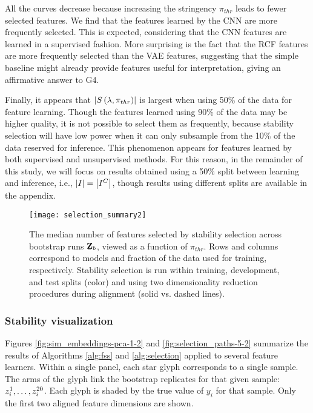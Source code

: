 All the curves decrease because increasing the stringency $\pi_{thr}$ leads to
fewer selected features. We find that the features learned by the CNN are more
frequently selected. This is expected, considering that the CNN features are
learned in a supervised fashion. More surprising is the fact that the RCF
features are more frequently selected than the VAE features, suggesting that the
simple baseline might already provide features useful for interpretation, giving
an affirmative answer to G4.

Finally, it appears that $\left|S\left(\lambda, \pi_{thr}\right)\right|$ is largest
when using 50\% of the data for feature learning. Though the features learned
using 90\% of the data may be higher quality, it is not possible to select them
as frequently, because stability selection will have low power when it can only
subsample from the 10\% of the data reserved for inference. This phenomenon
appears for features learned by both supervised and unsupervised methods. For
this reason, in the remainder of this study, we will focus on results obtained
using a 50\% split between learning and inference, i.e., $\left|I\right| =
\left|I^{C}\right|$, though results using different splits are available in the
appendix.

\begin{figure}
  \centering
  \texttt{[image: selection\_summary2]}
  \caption{The median number of features selected by stability selection across
    bootstrap runs $\protect\underaccent{\bar}{\mathbf{Z}}_{b}$, viewed as a
    function of $\pi_{thr}$. Rows and columns correspond to models and fraction
    of the data used for training, respectively. Stability selection is run
    within training, development, and test splits (color) and using two
    dimensionality reduction procedures during alignment (solid vs. dashed
    lines).}
  \label{fig:selection_summary}
\end{figure}

\subsubsection{Stability visualization}

Figures \ref{fig:sim_embeddings-pca-1-2} and \ref{fig:selection_paths-5-2}
summarize the results of Algorithms \ref{alg:fss} and \ref{alg:selection}
applied to several feature learners. Within a single panel, each star glyph
corresponds to a single sample. The arms of the glyph link the bootstrap
replicates for that given sample: $\protect z_{i}^{1}, \dots, z_{i}^{20}$. Each
glyph is shaded by the true value of $y_{i}$ for that sample. Only the first two
aligned feature dimensions are shown.

